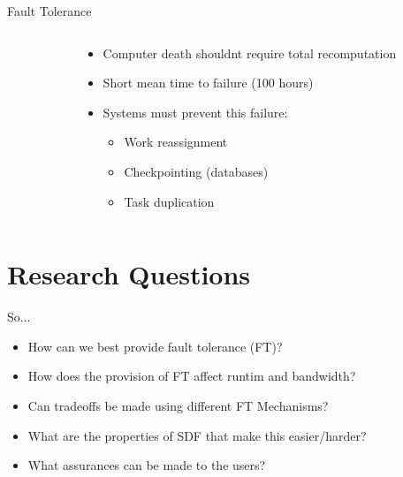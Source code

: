 \documentclass{beamer}
\begin{document}
\begin{frame}{Fault Tolerance}
\begin{columns}
\begin{column}{4cm}
\end{column}
\begin{column}{6cm}
\begin{itemize}
	\item Computer death shouldnt require total recomputation
	\item Short mean time to failure (100 hours) \cite{ree06}
	\item Systems must prevent this failure:
	\begin{itemize}
		\item Work reassignment \cite{dea08}
		\item Checkpointing (databases)
		\item Task duplication
	\end{itemize}
\end{itemize}
\end{column}
\end{columns}
\end{frame}

\section{Research Questions}

\begin{frame}{So...}
\begin{itemize}
	\item How can we best provide fault tolerance (FT)?
	\item How does the provision of FT affect runtim and bandwidth?
	\item Can tradeoffs be made using different FT Mechanisms?
	\item What are the properties of SDF that make this easier/harder?
	\item What assurances can be made to the users?
\end{itemize}
\end{frame}
\end{document}
